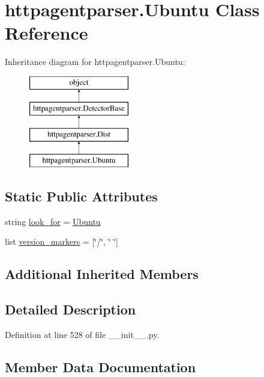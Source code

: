 \hypertarget{classhttpagentparser_1_1_ubuntu}{}\section{httpagentparser.\+Ubuntu Class Reference}
\label{classhttpagentparser_1_1_ubuntu}
Inheritance diagram for httpagentparser.\+Ubuntu\+:\begin{figure}[H]
\begin{center}
\leavevmode
\includegraphics[height=4.000000cm]{classhttpagentparser_1_1_ubuntu}
\end{center}
\end{figure}
\subsection*{Static Public Attributes}
\begin{DoxyCompactItemize}
\item 
string \hyperlink{classhttpagentparser_1_1_ubuntu_a4148e58fc64dfa1d50684013d256ac55}{look\+\_\+for} = \textquotesingle{}\hyperlink{classhttpagentparser_1_1_ubuntu}{Ubuntu}\textquotesingle{}
\item 
list \hyperlink{classhttpagentparser_1_1_ubuntu_a9a70602ae3c550ef356cc1df6403afe4}{version\+\_\+markers} = \mbox{[}\char`\"{}/\char`\"{}, \char`\"{} \char`\"{}\mbox{]}
\end{DoxyCompactItemize}
\subsection*{Additional Inherited Members}


\subsection{Detailed Description}


Definition at line 528 of file \+\_\+\+\_\+init\+\_\+\+\_\+.\+py.



\subsection{Member Data Documentation}
\hypertarget{classhttpagentparser_1_1_ubuntu_a4148e58fc64dfa1d50684013d256ac55}{}\label{classhttpagentparser_1_1_ubuntu_a4148e58fc64dfa1d50684013d256ac55} 
